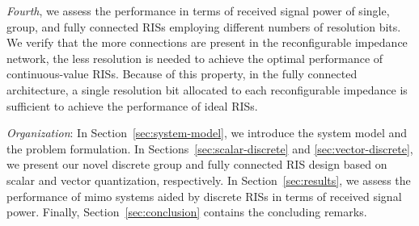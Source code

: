 \documentclass[twocolumn,10pt]{IEEEtran}
\begin{document}
\textit{Fourth}, we assess the performance in terms of received signal power of single, group, and fully connected RISs employing different numbers of resolution bits.
We verify that the more connections are present in the reconfigurable impedance network, the less resolution is needed to achieve the optimal performance of continuous-value RISs.
Because of this property, in the fully connected architecture, a single resolution bit allocated to each reconfigurable impedance is sufficient to achieve the performance of ideal RISs.

\textit{Organization}: In Section~\ref{sec:system-model}, we introduce the system model and the problem formulation.
In Sections~\ref{sec:scalar-discrete} and \ref{sec:vector-discrete}, we present our novel discrete group and fully connected RIS design based on scalar and vector quantization, respectively.
In Section~\ref{sec:results}, we assess the performance of \gls{mimo} systems aided by discrete RISs in terms of received signal power.
Finally, Section~\ref{sec:conclusion} contains the concluding remarks.
\end{document}
